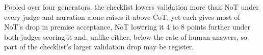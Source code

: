 Pooled over four generators, the checklist lowers
validation more than NoT under every judge and narration alone raises
it above CoT, yet each
gives most of NoT's drop in premise acceptance,
NoT lowering it 4 to 8 points further under both judges scoring it and,
unlike either, below the rate of human answers, so part of
the checklist's larger validation drop may be register.
